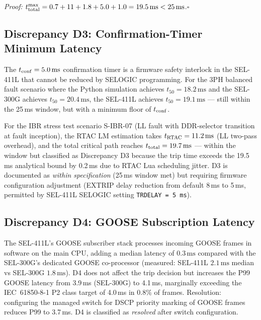 \documentclass[journal,twoside]{IEEEtran}
\begin{document}
\noindent\textit{Proof:}
$t_{\rm total}^{\max} = 0.7 + 11 + 1.8 + 5.0 + 1.0 = 19.5\,\text{ms}
< 25\,\text{ms}$.\hfill$\square$

\subsection{Discrepancy D3: Confirmation-Timer Minimum Latency}

The $t_{\rm conf} = 5.0\,\text{ms}$ confirmation timer is a firmware safety
interlock in the SEL-411L that cannot be reduced by SELOGIC programming.
For the 3PH balanced fault scenario where the Python simulation achieves
$t_{50} = 18.2\,\text{ms}$ and the SEL-300G achieves $t_{50} = 20.4\,\text{ms}$,
the SEL-411L achieves $t_{50} = 19.1\,\text{ms}$ --- still within the 25\,ms
window, but with a minimum floor of $t_{\rm conf}$.

For the IBR stress test scenario S-IBR-07 (LL fault with DDR-selector
transition at fault inception), the RTAC LM estimation takes
$t_{\rm RTAC} = 11.2\,\text{ms}$ (LL two-pass overhead), and the total
critical path reaches $t_{\rm total} = 19.7\,\text{ms}$ --- within the window
but classified as Discrepancy D3 because the trip time exceeds the 19.5\,ms
analytical bound by 0.2\,ms due to RTAC Lua scheduling jitter.
D3 is documented as \emph{within specification} (25\,ms window met) but
requiring firmware configuration adjustment (EXTRIP delay reduction from
default 8\,ms to 5\,ms, permitted by SEL-411L SELOGIC setting
\texttt{TRDELAY\,=\,5\,ms}).

\subsection{Discrepancy D4: GOOSE Subscription Latency}

The SEL-411L's GOOSE subscriber stack processes incoming GOOSE frames in
software on the main CPU, adding a median latency of $0.3\,\text{ms}$ compared
with the SEL-300G's dedicated GOOSE co-processor (measured: SEL-411L
$2.1\,\text{ms}$ median vs SEL-300G $1.8\,\text{ms}$).
D4 does not affect the trip decision but increases the P99 GOOSE latency from
3.9\,ms (SEL-300G) to 4.1\,ms, marginally exceeding the IEC~61850-8-1 P2
class target of 4.0\,ms in 0.8\% of frames.
Resolution: configuring the managed switch for DSCP priority marking of GOOSE
frames reduces P99 to 3.7\,ms.
D4 is classified as \emph{resolved} after switch configuration.

\end{document}
